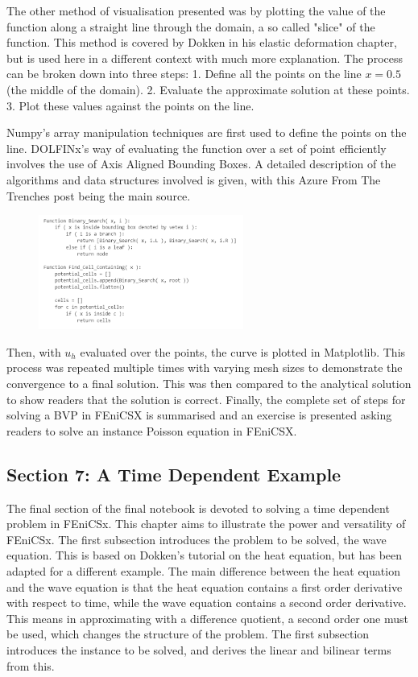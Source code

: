 The other method of visualisation presented was by plotting the value of the function along a straight line through the domain, a so called "slice" of the function. This method is covered by Dokken in his elastic deformation chapter, but is used here in a different context with much more explanation. The process can be broken down into three steps: 1. Define all the points on the line $x=0.5$ (the middle of the domain). 2. Evaluate the approximate solution at these points. 3. Plot these values against the points on the line.

Numpy's array manipulation techniques are first used to define the points on the line. DOLFINx's way of evaluating the function over a set of point efficiently involves the use of Axis Aligned Bounding Boxes. A detailed description of the algorithms and data structures involved is given, with this Azure From The Trenches post \cite{aabb-tree} being the main source. 

\begin{figure}[h]
\centering
\includegraphics[width=0.6\textwidth, frame]{./images/notebook3/3}
\end{figure}

Then, with $u_h$ evaluated over the points, the curve is plotted in Matplotlib. This process was repeated multiple times with varying mesh sizes to demonstrate the convergence to a final solution. This was then compared to the analytical solution to show readers that the solution is correct. Finally, the complete set of steps for solving a BVP in FEniCSX is summarised and an exercise is presented asking readers to solve an instance Poisson equation in FEniCSX.

\subsection{Section 7: A Time Dependent Example}

The final section of the final notebook is devoted to solving a time dependent problem in FEniCSx. This chapter aims to illustrate the power and versatility of FEniCSx. The first subsection introduces the problem to be solved, the wave equation. This is based on Dokken's tutorial on the heat equation, but has been adapted for a different example. The main difference between the heat equation and the wave equation is that the heat equation contains a first order derivative with respect to time, while the wave equation contains a second order derivative. This means in approximating with a difference quotient, a second order one must be used, which changes the structure of the problem. The first subsection introduces the instance to be solved, and derives the linear and bilinear terms from this.

